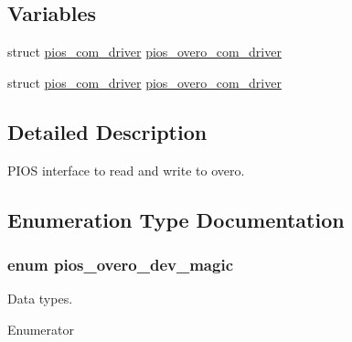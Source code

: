 \subsection*{Variables}
\begin{DoxyCompactItemize}
\item 
struct \hyperlink{structpios__com__driver}{pios\-\_\-com\-\_\-driver} \hyperlink{group___p_i_o_s___o_v_e_r_o_ga07e1a9093b33ec66c4e896e83834bfd6}{pios\-\_\-overo\-\_\-com\-\_\-driver}
\item 
struct \hyperlink{structpios__com__driver}{pios\-\_\-com\-\_\-driver} \hyperlink{group___p_i_o_s___o_v_e_r_o_ga07e1a9093b33ec66c4e896e83834bfd6}{pios\-\_\-overo\-\_\-com\-\_\-driver}
\end{DoxyCompactItemize}


\subsection{Detailed Description}
P\-I\-O\-S interface to read and write to overo. 

\subsection{Enumeration Type Documentation}
\hypertarget{group___p_i_o_s___o_v_e_r_o_ga9b9fb7573bead7d69299823fb7f7a372}{
\subsubsection[{pios\-\_\-overo\-\_\-dev\-\_\-magic}]{\setlength{\rightskip}{0pt plus 5cm}enum {\bf pios\-\_\-overo\-\_\-dev\-\_\-magic}}}\label{group___p_i_o_s___o_v_e_r_o_ga9b9fb7573bead7d69299823fb7f7a372}


Data types. 

\begin{Desc}
\item[Enumerator]\par
\begin{description}
\item[{\em 
\hypertarget{group___p_i_o_s___o_v_e_r_o_gga9b9fb7573bead7d69299823fb7f7a372a4b3b30ca1a20eb319f55d522e4eb1789}{P\-I\-O\-S\-\_\-\-O\-V\-E\-R\-O\-\_\-\-D\-E\-V\-\_\-\-M\-A\-G\-I\-C}\label{group___p_i_o_s___o_v_e_r_o_gga9b9fb7573bead7d69299823fb7f7a372a4b3b30ca1a20eb319f55d522e4eb1789}
}]\end{description}
\end{Desc}


